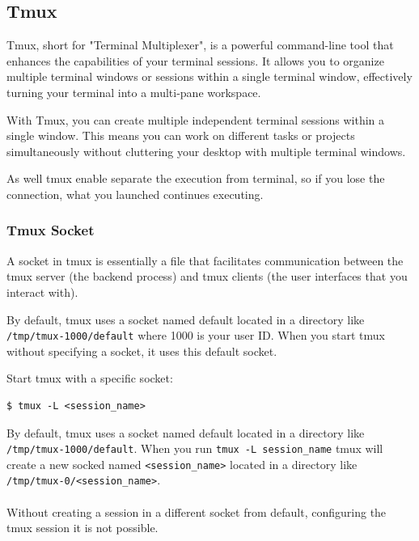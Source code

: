 \documentclass{article}
\newenvironment{blocktemplateII}[1]{%
    \tcolorbox[beamer,%
    noparskip,breakable,
    colframe=Green,%
    colbacklower=LimeGreen!75!LightGreen,%
    title=#1]}%
    {\endtcolorbox}
\newenvironment{codetemplate}[1][]{%
  \mybasecolorbox[#1]
  \itshape
}{%
  \endmybasecolorbox
}
\begin{document}
\subsection{Tmux}

Tmux, short for "Terminal Multiplexer", is a powerful command-line tool that enhances the capabilities of your terminal sessions. It allows you to organize multiple terminal windows or sessions within a single terminal window, effectively turning your terminal into a multi-pane workspace.

With Tmux, you can create multiple independent terminal sessions within a single window. This means you can work on different tasks or projects simultaneously without cluttering your desktop with multiple terminal windows.

As well tmux enable separate the execution from terminal, so if you lose the connection, what you launched continues executing.

\subsubsection{Tmux Socket}
A socket in tmux is essentially a file that facilitates communication between the tmux server (the backend process) and tmux clients (the user interfaces that you interact with).

By default, tmux uses a socket named default located in a directory like \verb|/tmp/tmux-1000/default| where 1000 is your user ID. When you start tmux without specifying a socket, it uses this default socket.

Start tmux with a specific socket:
\begin{codetemplate}
\begin{verbatim}
$ tmux -L <session_name>
\end{verbatim}
\end{codetemplate}

\begin{blocktemplateII}{Note}
By default, tmux uses a socket named default located in a directory like \verb|/tmp/tmux-1000/default|.
When you run \verb|tmux -L session_name| tmux will create a new socked named \verb|<session_name>| located in a directory like \verb|/tmp/tmux-0/<session_name>|.
\\\\
Without creating a session in a different socket from default, configuring the tmux session it is not possible. 
\end{blocktemplateII}
\end{document}
